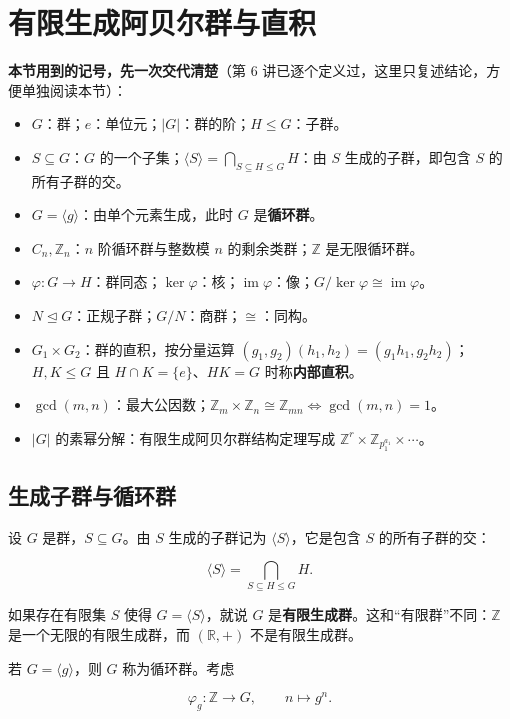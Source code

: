 \section{有限生成阿贝尔群与直积}


\textbf{本节用到的记号，先一次交代清楚}（第 6 讲已逐个定义过，这里只复述结论，方便单独阅读本节）：

\begin{itemize}
\item $G$：群；$e$：单位元；$|G|$：群的阶；$H\le G$：子群。
\item $S\subseteq G$：$G$ 的一个子集；$\langle S\rangle=\bigcap_{S\subseteq H\le G}H$：由 $S$ 生成的子群，即包含 $S$ 的所有子群的交。
\item $G=\langle g\rangle$：由单个元素生成，此时 $G$ 是\textbf{循环群}。
\item $C_n,\mathbb Z_n$：$n$ 阶循环群与整数模 $n$ 的剩余类群；$\mathbb Z$ 是无限循环群。
\item $\varphi:G\to H$：群同态；$\ker\varphi$：核；$\operatorname{im}\varphi$：像；$G/\ker\varphi\cong\operatorname{im}\varphi$。
\item $N\trianglelefteq G$：正规子群；$G/N$：商群；$\cong$：同构。
\item $G_1\times G_2$：群的直积，按分量运算 $(g_1,g_2)(h_1,h_2)=(g_1h_1,g_2h_2)$；$H,K\le G$ 且 $H\cap K=\{e\}$、$HK=G$ 时称\textbf{内部直积}。
\item $\gcd(m,n)$：最大公因数；$\mathbb Z_m\times\mathbb Z_n\cong\mathbb Z_{mn}\iff\gcd(m,n)=1$。
\item $|G|$ 的素幂分解：有限生成阿贝尔群结构定理写成 $\mathbb Z^r\times\mathbb Z_{p_1^{a_1}}\times\cdots$。
\end{itemize}


\subsection{生成子群与循环群}


设 $G$ 是群，$S\subseteq G$。由 $S$ 生成的子群记为 $\langle S\rangle$，它是包含 $S$ 的所有子群的交：

\[
\langle S\rangle=\bigcap_{S\subseteq H\le G}H.
\]

如果存在有限集 $S$ 使得 $G=\langle S\rangle$，就说 $G$ 是\textbf{有限生成群}。这和“有限群”不同：$\mathbb Z$ 是一个无限的有限生成群，而 $(\mathbb R,+)$ 不是有限生成群。

若 $G=\langle g\rangle$，则 $G$ 称为循环群。考虑

\[
\varphi_g:\mathbb Z\longrightarrow G,\qquad n\longmapsto g^n.
\]

